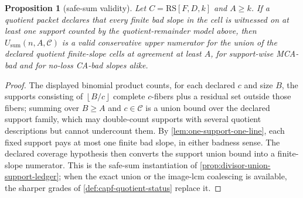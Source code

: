\documentclass[11pt]{article}
\newtheorem{proposition}[proposition]{Proposition}
\theoremstyle{definition}
\theoremstyle{remark}
\newcommand{\RS}{\mathrm{RS}}
\providecommand{\floor}[1]{\left\lfloor #1\right\rfloor}
\begin{document}
\begin{proposition}[safe-sum validity]\label{prop:capf-quotient-safe-sum}
Let $C=\RS[F,D,k]$ and $A\ge k$.  If a quotient packet declares that every finite bad slope in the cell is witnessed on at least one support counted by the quotient-remainder model above, then $U_{\mathrm{sum}}(n,A,\mathcal C)$ is a valid conservative upper numerator for the union of the declared quotient finite-slope cells at agreement at least $A$, for support-wise MCA-bad and for no-loss CA-bad slopes alike.
\end{proposition}

\begin{proof}
The displayed binomial product counts, for each declared $c$ and size $B$, the supports consisting of $\floor{B/c}$ complete $c$-fibers plus a residual set outside those fibers; summing over $B\ge A$ and $c\in\mathcal C$ is a union bound over the declared support family, which may double-count supports with several quotient descriptions but cannot undercount them.  By \cref{lem:one-support-one-line}, each fixed support pays at most one finite bad slope, in either badness sense.  The declared coverage hypothesis then converts the support union bound into a finite-slope numerator.  This is the safe-sum instantiation of \cref{prop:divisor-union-support-ledger}; when the exact union or the image-lcm coalescing is available, the sharper grades of \cref{def:capf-quotient-status} replace it.
\end{proof}
\end{document}
